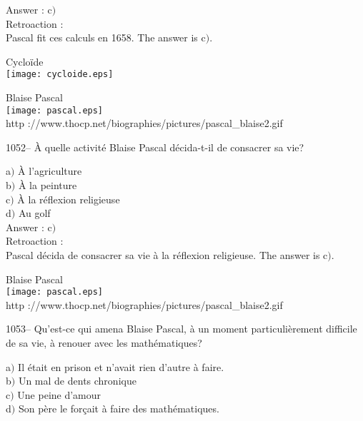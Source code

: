 ﻿\documentclass[letterpaper, 12pt]{article}
\begin{document}
Answer : c$)$\\

Retroaction : \\
Pascal fit ces calculs en 1658.
The answer is c$)$.\\

        \begin{center}

Cyclo\"ide\\
    \texttt{[image: cycloide.eps]}\\
    \end{center}

        \begin{center}
        Blaise Pascal\\
    \texttt{[image: pascal.eps]}\\
        {\footnotesize http
://www.thocp.net/biographies/pictures/pascal\_blaise2.gif}
    \end{center}

1052-- \`A quelle activit\'e Blaise Pascal d\'ecida-t-il de
consacrer sa vie?

a$)$ \`A l'agriculture \\
b$)$ \`A la peinture  \\
c$)$ \`A la r\'eflexion religieuse  \\
d$)$ Au golf\\

Answer : c$)$\\

Retroaction : \\
Pascal d\'ecida de consacrer sa vie \`a la r\'eflexion religieuse.
The answer is c$)$.\\

        \begin{center}
        Blaise Pascal\\
    \texttt{[image: pascal.eps]}\\
        {\footnotesize http
://www.thocp.net/biographies/pictures/pascal\_blaise2.gif}
    \end{center}

1053-- Qu'est-ce qui amena Blaise Pascal, \`a un moment
particuli\`erement difficile de sa vie, \`a renouer avec les
math\'ematiques?

a$)$ Il \'etait en prison et n'avait rien d'autre \`a faire. \\
b$)$ Un mal de dents chronique  \\
c$)$ Une peine d'amour  \\
d$)$ Son p\`ere le for\c cait \`a faire des math\'ematiques.\\
\end{document}
